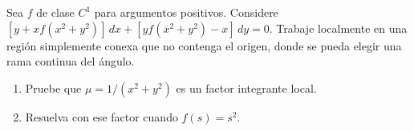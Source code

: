 Sea $f$ de clase $C^1$ para argumentos positivos. Considere $[y+xf(x^2+y^2)]\,dx+[yf(x^2+y^2)-x]\,dy=0$. Trabaje localmente en una región simplemente conexa que no contenga el origen, donde se pueda elegir una rama continua del ángulo.

\begin{enumerate}[label=(\alph*),ref=\alph*,leftmargin=*]
\item Pruebe que $\mu=1/(x^2+y^2)$ es un factor integrante local.
\item Resuelva con ese factor cuando $f(s)=s^2$.
\end{enumerate}
